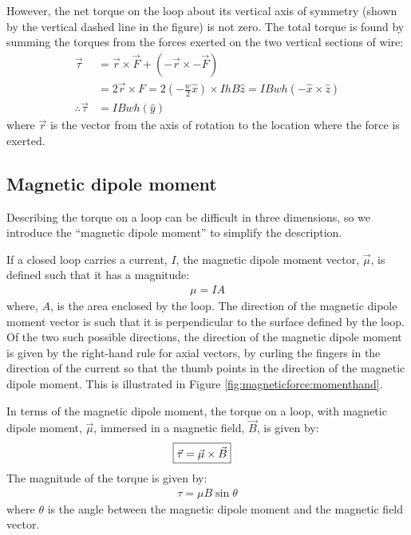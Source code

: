 However, the net torque on the loop about its vertical axis of symmetry (shown by the vertical dashed line in the figure) is not zero. The total torque is found by summing the torques from the forces exerted on the two vertical sections of wire:
\begin{align*}
\vec \tau &= \vec r\times \vec F + (-\vec r \times - \vec F)\\
&= 2 \vec r \times F = 2 (-\frac{w}{2}\hat x) \times IhB\hat z = IBwh (-\hat x\times \hat z)\\
\therefore \vec \tau&=IBwh (\hat y)
\end{align*}
where $\vec r$ is the vector from the axis of rotation to the location where the force is exerted.

\subsection{Magnetic dipole moment}
\label{sec:MagneticForce:dipolemoment}
Describing the torque on a loop can be difficult in three dimensions, so we introduce the ``magnetic dipole moment'' to simplify the description.

If a closed loop carries a current, $I$, the magnetic dipole moment vector, $\vec \mu$, is defined such that it has a magnitude:
\begin{align*}
\mu = IA
\end{align*}
where, $A$, is the area enclosed by the loop. The direction of the magnetic dipole moment vector is such that it is perpendicular to the surface defined by the loop. Of the two such possible directions, the direction of the magnetic dipole moment is given by the right-hand rule for axial vectors, by curling the fingers in the direction of the current so that the thumb points in the direction of the magnetic dipole moment. This is illustrated in Figure \ref{fig:magneticforce:momenthand}.

In terms of the magnetic dipole moment, the torque on a loop, with magnetic dipole moment, $\vec \mu$, immersed in a magnetic field, $\vec B$, is given by:
\begin{align*}
\Aboxed{\vec \tau = \vec \mu \times \vec B}
\end{align*}
The magnitude of the torque is given by:
\begin{align*}
\tau =\mu B \sin\theta
\end{align*}
where $\theta$ is the angle between the magnetic dipole moment and the magnetic field vector.

